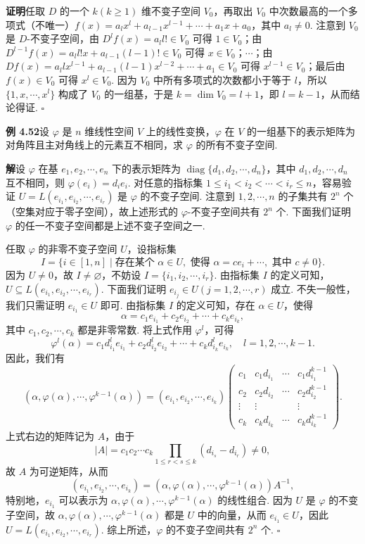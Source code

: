 \documentclass[UTF8, 12pt, fontset=fandol, oneside]{ctexart}
\begin{document}
\noindent\textbf{证明}\quad 任取 $D$ 的一个 $k(k\ge1)$ 维不变子空间 $V_0$，再取出 $V_0$ 中次数最高的一个多项式（不唯一）$f(x)=a_lx^l+a_{l-1}x^{l-1}+\cdots+a_1x+a_0$，其中 $a_l\ne0$. 注意到 $V_0$ 是 $D$-不变子空间，由 $D^lf(x)=a_ll!\in V_0$ 可得 $1\in V_0$；由 $D^{l-1}f(x)=a_ll!x+a_{l-1}(l-1)!\in V_0$ 可得 $x\in V_0$；$\cdots$；由 $Df(x)=a_llx^{l-1}+a_{l-1}(l-1)x^{l-2}+\cdots+a_1\in V_0$ 可得 $x^{l-1}\in V_0$；最后由 $f(x)\in V_0$ 可得 $x^l\in V_0$. 因为 $V_0$ 中所有多项式的次数都小于等于 $l$，所以 $\{1,x,\cdots,x^l\}$ 构成了 $V_0$ 的一组基，于是 $k=\dim V_0=l+1$，即 $l=k-1$，从而结论得证. $\square$

\noindent\textbf{例 4.52}\quad 设 $\varphi$ 是 $n$ 维线性空间 $V$ 上的线性变换，$\varphi$ 在 $V$ 的一组基下的表示矩阵为对角阵且主对角线上的元素互不相同，求 $\varphi$ 的所有不变子空间.

\noindent\textbf{解}\quad 设 $\varphi$ 在基 $e_1,e_2,\cdots,e_n$ 下的表示矩阵为 $\operatorname{diag}\{d_1,d_2,\cdots,d_n\}$，其中 $d_1,d_2,\cdots,d_n$ 互不相同，则 $\varphi(e_i)=d_ie_i$. 对任意的指标集 $1\le i_1<i_2<\cdots<i_r\le n$，容易验证 $U=L(e_{i_1},e_{i_2},\cdots,e_{i_r})$ 是 $\varphi$ 的不变子空间. 注意到 $1,2,\cdots,n$ 的子集共有 $2^n$ 个（空集对应于零子空间），故上述形式的 $\varphi$-不变子空间共有 $2^n$ 个. 下面我们证明 $\varphi$ 的任一不变子空间都是上述不变子空间之一.

任取 $\varphi$ 的非零不变子空间 $U$，设指标集
\[
I=\{i\in[1,n]\mid \text{存在某个 }\alpha\in U,\text{ 使得 }\alpha=ce_i+\cdots,\text{ 其中 }c\ne0\}.
\]
因为 $U\ne0$，故 $I\ne\varnothing$，不妨设 $I=\{i_1,i_2,\cdots,i_r\}$. 由指标集 $I$ 的定义可知，$U\subseteq L(e_{i_1},e_{i_2},\cdots,e_{i_r})$. 下面我们证明 $e_{i_j}\in U(j=1,2,\cdots,r)$ 成立. 不失一般性，我们只需证明 $e_{i_1}\in U$ 即可. 由指标集 $I$ 的定义可知，存在 $\alpha\in U$，使得
\[
\alpha=c_1e_{i_1}+c_2e_{i_2}+\cdots+c_ke_{i_k},
\]
其中 $c_1,c_2,\cdots,c_k$ 都是非零常数. 将上式作用 $\varphi^l$，可得
\[
\varphi^l(\alpha)=c_1d_{i_1}^le_{i_1}+c_2d_{i_2}^le_{i_2}+\cdots+c_kd_{i_k}^le_{i_k},\quad l=1,2,\cdots,k-1.
\]
因此，我们有
\[
(\alpha,\varphi(\alpha),\cdots,\varphi^{k-1}(\alpha))
=(e_{i_1},e_{i_2},\cdots,e_{i_k})
\left(\begin{array}{cccc}
c_1 & c_1d_{i_1} & \cdots & c_1d_{i_1}^{k-1}\\
c_2 & c_2d_{i_2} & \cdots & c_2d_{i_2}^{k-1}\\
\vdots & \vdots &        & \vdots\\
c_k & c_kd_{i_k} & \cdots & c_kd_{i_k}^{k-1}
\end{array}\right).
\]
上式右边的矩阵记为 $A$，由于
\[
|A|=c_1c_2\cdots c_k\prod_{1\le r<s\le k}(d_{i_s}-d_{i_r})\ne0,
\]
故 $A$ 为可逆矩阵，从而
\[
(e_{i_1},e_{i_2},\cdots,e_{i_k})=(\alpha,\varphi(\alpha),\cdots,\varphi^{k-1}(\alpha))A^{-1},
\]
特别地，$e_{i_1}$ 可以表示为 $\alpha,\varphi(\alpha),\cdots,\varphi^{k-1}(\alpha)$ 的线性组合. 因为 $U$ 是 $\varphi$ 的不变子空间，故 $\alpha,\varphi(\alpha),\cdots,\varphi^{k-1}(\alpha)$ 都是 $U$ 中的向量，从而 $e_{i_1}\in U$，因此 $U=L(e_{i_1},e_{i_2},\cdots,e_{i_r})$. 综上所述，$\varphi$ 的不变子空间共有 $2^n$ 个. $\square$
\end{document}
